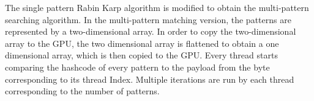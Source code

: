 The single pattern Rabin Karp algorithm is modified to obtain the multi-pattern searching algorithm. In the multi-pattern matching version, the patterns are represented by a two-dimensional array. In order to copy the two-dimensional array to the GPU, the two dimensional array is flattened to obtain a one dimensional array, which is then copied to the GPU. Every thread starts comparing the hashcode of every pattern to the payload from the byte corresponding to its thread Index. Multiple iterations are run by each thread corresponding to the number of patterns. 
